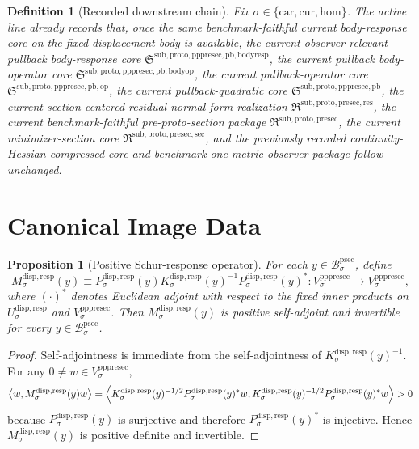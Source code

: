 \documentclass[11pt]{article}
\newcommand{\Car}{\mathrm{car}}
\newcommand{\Cur}{\mathrm{cur}}
\newcommand{\Hom}{\mathrm{hom}}
\newcommand{\ProtoSectionBody}[1]{\mathcal B_{#1}^{\mathrm{psec}}}
\newcommand{\PrePreProtoSectionPullbackCore}{\mathfrak S^{\mathrm{sub,proto,pppresec,pb}}}
\newcommand{\PrePreProtoSectionVertical}[1]{V_{#1}^{\mathrm{pppresec}}}
\newcommand{\PullbackOperatorCore}{\mathfrak S^{\mathrm{sub,proto,pppresec,pb,op}}}
\newcommand{\PullbackBodyOperatorCore}{\mathfrak S^{\mathrm{sub,proto,pppresec,pb,bodyop}}}
\newcommand{\PullbackBodyResponseCore}{\mathfrak S^{\mathrm{sub,proto,pppresec,pb,bodyresp}}}
\newcommand{\PreProtoSectionResidualPackage}{\mathfrak R^{\mathrm{sub,proto,presec,res}}}
\newcommand{\PreProtoSectionPackage}{\mathfrak R^{\mathrm{sub,proto,presec}}}
\newcommand{\PreProtoSectionMinSectionCore}{\mathfrak R^{\mathrm{sub,proto,presec,sec}}}
\newcommand{\SubstrateCarrier}[1]{U_{#1}^{\mathrm{disp,resp}}}
\newcommand{\SubstrateProjection}[1]{P_{#1}^{\mathrm{disp,resp}}}
\newcommand{\SubstrateOperator}[1]{K_{#1}^{\mathrm{disp,resp}}}
\newcommand{\SchurResponse}[1]{M_{#1}^{\mathrm{disp,resp}}}
\newtheorem{definition}{Definition}
\newtheorem{proposition}{Proposition}
\begin{document}
\begin{definition}[Recorded downstream chain]
\label{def:downstream}
Fix \(\sigma\in\{\Car,\Cur,\Hom\}\). The active line already records that, once the same benchmark-faithful current body-response core on the fixed displacement body is available, the current observer-relevant pullback body-response core \(\PullbackBodyResponseCore\), the current pullback body-operator core \(\PullbackBodyOperatorCore\), the current pullback-operator core \(\PullbackOperatorCore\), the current pullback-quadratic core \(\PrePreProtoSectionPullbackCore\), the current section-centered residual-normal-form realization \(\PreProtoSectionResidualPackage\), the current benchmark-faithful pre-proto-section package \(\PreProtoSectionPackage\), the current minimizer-section core \(\PreProtoSectionMinSectionCore\), and the previously recorded continuity-Hessian compressed core and benchmark one-metric observer package follow unchanged.
\end{definition}

\section{Canonical Image Data}

\begin{proposition}[Positive Schur-response operator]
\label{prop:schur}
For each \(y\in\ProtoSectionBody{\sigma}\), define
\[
\SchurResponse{\sigma}(y)
\equiv
\SubstrateProjection{\sigma}(y)
\SubstrateOperator{\sigma}(y)^{-1}
\SubstrateProjection{\sigma}(y)^*:
\PrePreProtoSectionVertical{\sigma}\to\PrePreProtoSectionVertical{\sigma},
\]
where \((\cdot)^*\) denotes Euclidean adjoint with respect to the fixed inner products on \(\SubstrateCarrier{\sigma}\) and \(\PrePreProtoSectionVertical{\sigma}\). Then \(\SchurResponse{\sigma}(y)\) is positive self-adjoint and invertible for every \(y\in\ProtoSectionBody{\sigma}\).
\end{proposition}

\begin{proof}
Self-adjointness is immediate from the self-adjointness of \(\SubstrateOperator{\sigma}(y)^{-1}\). For any \(0\neq w\in\PrePreProtoSectionVertical{\sigma}\),
\[
\ev{w,\SchurResponse{\sigma}(y)w}
=
\ev{
\SubstrateOperator{\sigma}(y)^{-1/2}\SubstrateProjection{\sigma}(y)^*w,
\SubstrateOperator{\sigma}(y)^{-1/2}\SubstrateProjection{\sigma}(y)^*w
}
>0
\]
because \(\SubstrateProjection{\sigma}(y)\) is surjective and therefore \(\SubstrateProjection{\sigma}(y)^*\) is injective. Hence \(\SchurResponse{\sigma}(y)\) is positive definite and invertible.
\end{proof}
\end{document}
